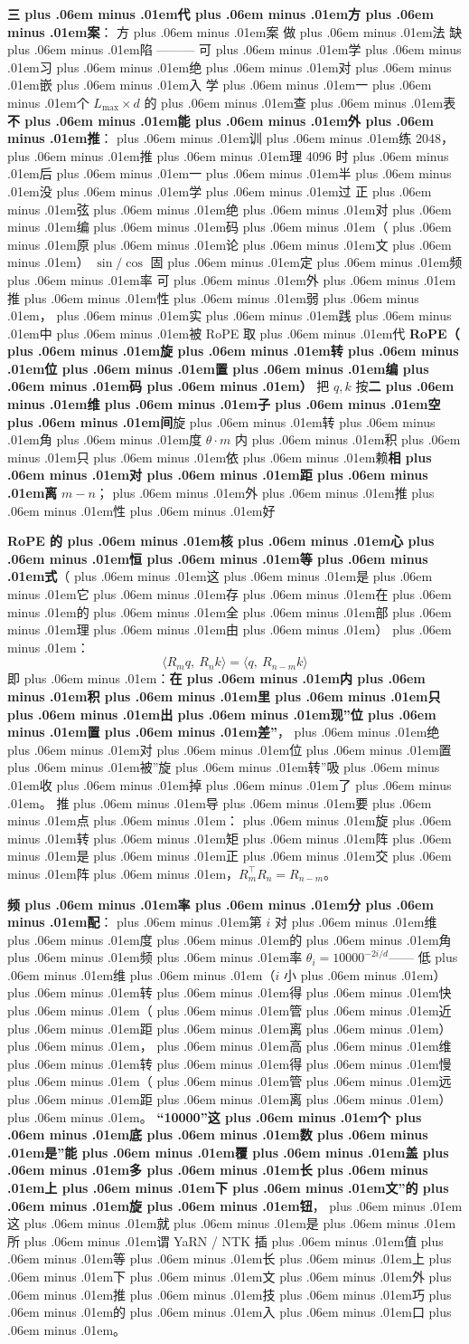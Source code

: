 \documentclass[
]{article}
\def\zh#1{{\zhfont #1}}
\def\zhglue{\hskip0pt plus .06em minus .01em}
\begin{document}
\textbf{\zh{三\zhglue 代\zhglue 方\zhglue 案}}\zh{：} \textbar{} \zh{方\zhglue 案} \textbar{} \zh{做\zhglue 法} \textbar{} \zh{缺\zhglue 陷} \textbar{} \textbar---\textbar---\textbar---\textbar{} \textbar{} \zh{可\zhglue 学\zhglue 习\zhglue 绝\zhglue 对\zhglue 嵌\zhglue 入} \textbar{} \zh{学\zhglue 一\zhglue 个} \(L_{\max}\times d\) \zh{的\zhglue 查\zhglue 表} \textbar{} \textbf{\zh{不\zhglue 能\zhglue 外\zhglue 推}}\zh{：\zhglue 训\zhglue 练} 2048\zh{，\zhglue 推\zhglue 理} 4096 \zh{时\zhglue 后\zhglue 一\zhglue 半\zhglue 没\zhglue 学\zhglue 过} \textbar{} \textbar{} \zh{正\zhglue 弦\zhglue 绝\zhglue 对\zhglue 编\zhglue 码\zhglue （\zhglue 原\zhglue 论\zhglue 文\zhglue ）} \textbar{} \(\sin/\cos\) \zh{固\zhglue 定\zhglue 频\zhglue 率} \textbar{} \zh{可\zhglue 外\zhglue 推\zhglue 性\zhglue 弱\zhglue ，\zhglue 实\zhglue 践\zhglue 中\zhglue 被} RoPE \zh{取\zhglue 代} \textbar{} \textbar{} \textbf{RoPE\zh{（\zhglue 旋\zhglue 转\zhglue 位\zhglue 置\zhglue 编\zhglue 码\zhglue ）}} \textbar{} \zh{把} \(q,k\) \zh{按}\textbf{\zh{二\zhglue 维\zhglue 子\zhglue 空\zhglue 间}}\zh{旋\zhglue 转\zhglue 角\zhglue 度} \(\theta\cdot m\) \textbar{} \zh{内\zhglue 积\zhglue 只\zhglue 依\zhglue 赖}\textbf{\zh{相\zhglue 对\zhglue 距\zhglue 离}} \(m-n\)\zh{；\zhglue 外\zhglue 推\zhglue 性\zhglue 好} \textbar{}

\textbf{RoPE \zh{的\zhglue 核\zhglue 心\zhglue 恒\zhglue 等\zhglue 式}}\zh{（\zhglue 这\zhglue 是\zhglue 它\zhglue 存\zhglue 在\zhglue 的\zhglue 全\zhglue 部\zhglue 理\zhglue 由\zhglue ）\zhglue ：} \[\langle R_m q,\ R_n k\rangle = \langle q,\ R_{n-m} k\rangle\] \zh{即\zhglue ：}\textbf{\zh{在\zhglue 内\zhglue 积\zhglue 里\zhglue 只\zhglue 出\zhglue 现}''\zh{位\zhglue 置\zhglue 差}''}\zh{，\zhglue 绝\zhglue 对\zhglue 位\zhglue 置\zhglue 被}''\zh{旋\zhglue 转}''\zh{吸\zhglue 收\zhglue 掉\zhglue 了\zhglue 。} \zh{推\zhglue 导\zhglue 要\zhglue 点\zhglue ：\zhglue 旋\zhglue 转\zhglue 矩\zhglue 阵\zhglue 是\zhglue 正\zhglue 交\zhglue 阵\zhglue ，}\(R_m^\top R_n = R_{n-m}\)\zh{。}

\textbf{\zh{频\zhglue 率\zhglue 分\zhglue 配}}\zh{：\zhglue 第} \(i\) \zh{对\zhglue 维\zhglue 度\zhglue 的\zhglue 角\zhglue 频\zhglue 率} \(\theta_i = 10000^{-2i/d}\)------ \zh{低\zhglue 维\zhglue （}\(i\) \zh{小\zhglue ）\zhglue 转\zhglue 得\zhglue 快\zhglue （\zhglue 管\zhglue 近\zhglue 距\zhglue 离\zhglue ）\zhglue ，\zhglue 高\zhglue 维\zhglue 转\zhglue 得\zhglue 慢\zhglue （\zhglue 管\zhglue 远\zhglue 距\zhglue 离\zhglue ）\zhglue 。} \textbf{``10000''\zh{这\zhglue 个\zhglue 底\zhglue 数\zhglue 是}''\zh{能\zhglue 覆\zhglue 盖\zhglue 多\zhglue 长\zhglue 上\zhglue 下\zhglue 文}''\zh{的\zhglue 旋\zhglue 钮}}\zh{，\zhglue 这\zhglue 就\zhglue 是\zhglue 所\zhglue 谓} YaRN / NTK \zh{插\zhglue 值\zhglue 等\zhglue 长\zhglue 上\zhglue 下\zhglue 文\zhglue 外\zhglue 推\zhglue 技\zhglue 巧\zhglue 的\zhglue 入\zhglue 口\zhglue 。}
\end{document}
